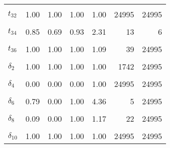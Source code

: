 \begin{table}
\begin{tabular}[t]{lrrrrrr}
\cellcolor{gray!6}{$t_{31}$} & \cellcolor{gray!6}{0.76} & \cellcolor{gray!6}{0.68} & \cellcolor{gray!6}{0.85} & \cellcolor{gray!6}{2.02} & \cellcolor{gray!6}{12} & \cellcolor{gray!6}{20}\\
$t_{32}$ & 1.00 & 1.00 & 1.00 & 1.00 & 24995 & 24995\\
\cellcolor{gray!6}{$t_{33}$} & \cellcolor{gray!6}{1.00} & \cellcolor{gray!6}{1.00} & \cellcolor{gray!6}{1.00} & \cellcolor{gray!6}{1.00} & \cellcolor{gray!6}{24995} & \cellcolor{gray!6}{24995}\\
$t_{34}$ & 0.85 & 0.69 & 0.93 & 2.31 & 13 & 6\\
\cellcolor{gray!6}{$t_{35}$} & \cellcolor{gray!6}{1.00} & \cellcolor{gray!6}{1.00} & \cellcolor{gray!6}{1.00} & \cellcolor{gray!6}{1.00} & \cellcolor{gray!6}{24995} & \cellcolor{gray!6}{24995}\\
$t_{36}$ & 1.00 & 1.00 & 1.00 & 1.09 & 39 & 24995\\
\cellcolor{gray!6}{$\delta_{1}$} & \cellcolor{gray!6}{0.00} & \cellcolor{gray!6}{0.00} & \cellcolor{gray!6}{0.00} & \cellcolor{gray!6}{1.00} & \cellcolor{gray!6}{24995} & \cellcolor{gray!6}{24995}\\
$\delta_{2}$ & 1.00 & 1.00 & 1.00 & 1.00 & 1742 & 24995\\
\cellcolor{gray!6}{$\delta_{3}$} & \cellcolor{gray!6}{0.93} & \cellcolor{gray!6}{0.00} & \cellcolor{gray!6}{1.00} & \cellcolor{gray!6}{1.13} & \cellcolor{gray!6}{26} & \cellcolor{gray!6}{24995}\\
$\delta_{4}$ & 0.00 & 0.00 & 0.00 & 1.00 & 24995 & 24995\\
\cellcolor{gray!6}{$\delta_{5}$} & \cellcolor{gray!6}{0.00} & \cellcolor{gray!6}{0.00} & \cellcolor{gray!6}{0.00} & \cellcolor{gray!6}{1.00} & \cellcolor{gray!6}{24995} & \cellcolor{gray!6}{24995}\\
$\delta_{6}$ & 0.79 & 0.00 & 1.00 & 4.36 & 5 & 24995\\
\cellcolor{gray!6}{$\delta_{7}$} & \cellcolor{gray!6}{0.77} & \cellcolor{gray!6}{0.00} & \cellcolor{gray!6}{1.00} & \cellcolor{gray!6}{2.62} & \cellcolor{gray!6}{6} & \cellcolor{gray!6}{24995}\\
$\delta_{8}$ & 0.09 & 0.00 & 1.00 & 1.17 & 22 & 24995\\
\cellcolor{gray!6}{$\delta_{9}$} & \cellcolor{gray!6}{1.00} & \cellcolor{gray!6}{1.00} & \cellcolor{gray!6}{1.00} & \cellcolor{gray!6}{1.00} & \cellcolor{gray!6}{12500} & \cellcolor{gray!6}{24995}\\
$\delta_{10}$ & 1.00 & 1.00 & 1.00 & 1.00 & 24995 & 24995\\

\end{tabular}
\end{table}
